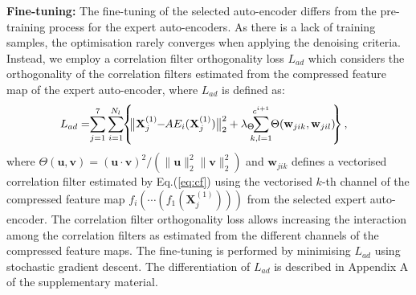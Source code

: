 \documentclass[10pt,twocolumn,letterpaper]{article}
\begin{document}
\textbf{Fine-tuning: }
The fine-tuning of the selected auto-encoder differs from the pre-training process for the expert auto-encoders.
As there is a lack of training samples, the optimisation rarely converges when applying the denoising criteria.
Instead, we employ a correlation filter orthogonality loss $L_{ad}$ which considers the orthogonality of the correlation filters estimated from the compressed feature map of the expert auto-encoder, where $L_{ad}$ is defined as:
\vspace{-2mm}
\begin{equation}
\small
\hspace{-3mm} L_{ad} = \hspace{-1mm} \sum_{j=1}^7 \sum_{i=1}^{N_l} \hspace{-1mm} \left\{ \hspace{-1mm} \big\| \mathbf{X}^{(1)}_j \hspace{-1mm}-\hspace{-1mm} AE_i(\mathbf{X}^{(1)}_j) \big\|_2^2 + \lambda_{\Theta} \hspace{-2mm} \sum_{k,l=1}^{c^{i+1}} \hspace{-1mm} \Theta(\mathbf{w}_{jik}, \mathbf{w}_{jil}) \hspace{-1mm}\right\},
\end{equation}
\normalsize
where $\Theta(\mathbf{u}, \mathbf{v}) = (\mathbf{u}\cdot\mathbf{v})^2 / (\|\mathbf{u}\|_2^2 \|\mathbf{v}\|_2^2) $ and $\mathbf{w}_{jik}$ defines a vectorised correlation filter estimated by Eq.(\ref{eq:cf}) using the vectorised $k$-th channel of the compressed feature map $f_i(\cdots(f_1(\mathbf{X}^{(1)}_j)))$ from the selected expert auto-encoder. 
The correlation filter orthogonality loss allows increasing the interaction among the correlation filters as estimated from the different channels of the compressed feature maps. 
The fine-tuning is performed by minimising $L_{ad}$ using stochastic gradient descent.
The differentiation of $L_{ad}$ is described in Appendix A of the supplementary material.
\end{document}
